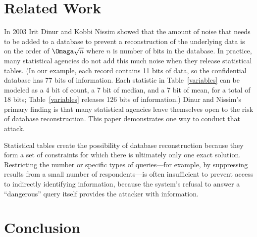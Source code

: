 \documentclass[runningheads]{llncs}
\begin{document}
\section{Related Work}

In 2003 Irit Dinur and Kobbi Nissim\cite{DinurNissim2003} showed that
the amount of noise that needs to be added to a database to prevent a
reconstruction of the underlying data is on the order of $\Omaga\sqrt{n}$
where $n$ is number of bits in the database. In practice, many statistical
agencies do not add this much noise when they release
statistical tables. (In our example, each
record contains 11 bits of data, so the confidential database has
77 bits of information. Each statistic in Table~\ref{variables}
can be modeled as a 4 bit of count, a 7 bit of median, and a 7 bit of
mean, for a total of 18 bits; Table~\ref{variables} releases 126 bits
of information.) Dinur and Nissim's primary finding
is that many statistical agencies leave themselves open to the risk of
database reconstruction. This paper demonstrates one way to
conduct that attack.

Statistical tables create the possibility of database reconstruction
because they form a set of constraints for which there is ultimately
only one exact solution. Restricting the number or specific types of
queries---for example, by suppressing results from a small number of
respondents---is often insufficient to prevent access to indirectly
identifying information, because the system's refusal to answer a
``dangerous'' query itself provides the attacker with information.



\section{Conclusion}
\end{document}
